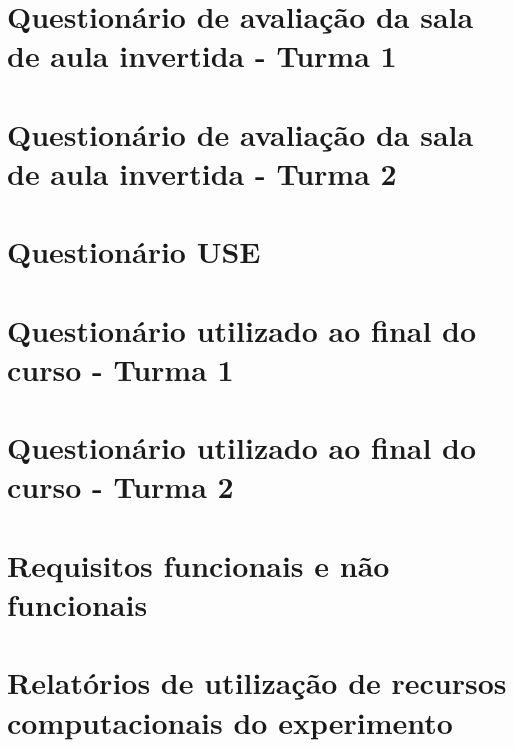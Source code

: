 \documentclass[
	12pt,				%
	oneside,			%
	a4paper,			%
	english,			%
	brazil				%
	]{abntex2ppgsi}
\begin{document}
\begin{apendicesenv}
\chapter{Questionário de avaliação da sala de aula invertida - Turma 1}
\label{cap:flipped_classroom_turma_1}


\chapter{Questionário de avaliação da sala de aula invertida - Turma 2}
\label{cap:flipped_classroom_turma_2}


\chapter{Questionário USE}
\label{cap:questionario_use}


\chapter{Questionário utilizado ao final do curso - Turma 1}
\label{cap:questionario_fim_curso_turma1}


\chapter{Questionário utilizado ao final do curso - Turma 2}
\label{cap:questionario_fim_curso_turma2}


\chapter{Requisitos funcionais e não funcionais}
\label{cap:requisitos_f_nf}


\chapter{Relatórios de utilização de recursos computacionais do experimento}
\label{cap:relatorios_uso}


\end{apendicesenv}
\end{document}
